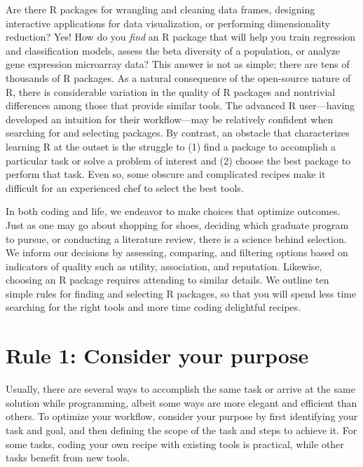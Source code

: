 \documentclass[10pt,letterpaper]{article}
\begin{document}
Are there R packages for wrangling and cleaning data frames, designing
interactive applications for data visualization, or performing
dimensionality reduction? Yes! How do you \emph{find} an R package that
will help you train regression and classification models, assess the
beta diversity of a population, or analyze gene expression microarray
data? This answer is not as simple; there are tens of thousands of R
packages. As a natural consequence of the open-source nature of R, there
is considerable variation in the quality of R packages and nontrivial
differences among those that provide similar tools. The advanced R
user---having developed an intuition for their workflow---may be
relatively confident when searching for and selecting packages. By
contrast, an obstacle that characterizes learning R at the outset is the
struggle to (1) find a package to accomplish a particular task or solve
a problem of interest and (2) choose the best package to perform that
task. Even so, some obscure and complicated recipes make it difficult
for an experienced chef to select the best tools.

In both coding and life, we endeavor to make choices that optimize
outcomes. Just as one may go about shopping for shoes, deciding which
graduate program to pursue, or conducting a literature review, there is
a science behind selection. We inform our decisions by assessing,
comparing, and filtering options based on indicators of quality such as
utility, association, and reputation. Likewise, choosing an R package
requires attending to similar details. We outline ten simple rules for
finding and selecting R packages, so that you will spend less time
searching for the right tools and more time coding delightful recipes.

\hypertarget{rule-1-consider-your-purpose}{%
\section{Rule 1: Consider your
purpose}\label{rule-1-consider-your-purpose}}

Usually, there are several ways to accomplish the same task or arrive at
the same solution while programming, albeit some ways are more elegant
and efficient than others. To optimize your workflow, consider your
purpose by first identifying your task and goal, and then defining the
scope of the task and steps to achieve it. For some tasks, coding your
own recipe with existing tools is practical, while other tasks benefit
from new tools.
\end{document}
